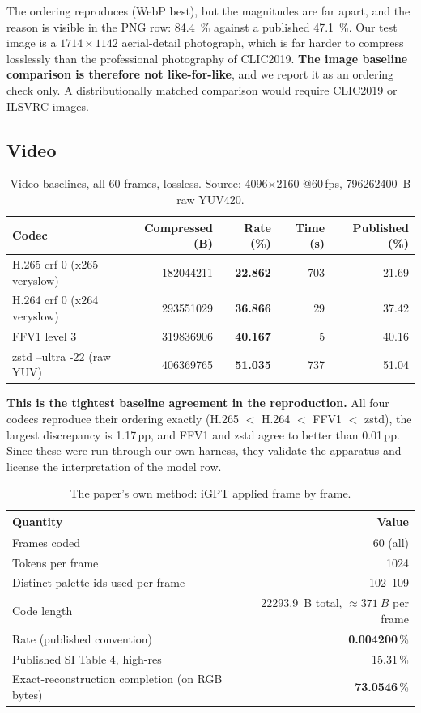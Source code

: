 \documentclass[11pt,a4paper]{article}
\begin{document}
The ordering reproduces (WebP best), but the magnitudes are far apart, and the
reason is visible in the PNG row: \SI{84.4}{\%} against a published
\SI{47.1}{\%}. Our test image is a $1714\times1142$ aerial-detail
photograph, which is far harder to compress losslessly than the professional
photography of CLIC2019. \textbf{The image baseline comparison is therefore not
like-for-like}, and we report it as an ordering check only. A distributionally
matched comparison would require CLIC2019 or ILSVRC images.

\subsection{Video}

\begin{table}[htbp]
\centering
\small
\caption{Video baselines, all \num{60} frames, lossless. Source: 4096$\times$2160
@60\,fps, \SI{796262400}{B} raw YUV420.}
\label{tab:videobase}
\begin{tabular}{lrrrr}
\toprule
Codec & Compressed (B) & Rate (\%) & Time (s) & Published (\%) \\
\midrule
H.265 crf 0 (x265 veryslow) & \num{182044211} & \textbf{22.862} & 703 & 21.69 \\
H.264 crf 0 (x264 veryslow) & \num{293551029} & \textbf{36.866} & 29 & 37.42 \\
FFV1 level 3 & \num{319836906} & \textbf{40.167} & 5 & 40.16 \\
zstd --ultra -22 (raw YUV) & \num{406369765} & \textbf{51.035} & 737 & 51.04 \\
\bottomrule
\end{tabular}
\end{table}

\textbf{This is the tightest baseline agreement in the reproduction.} All four
codecs reproduce their ordering exactly (H.265 $<$ H.264 $<$ FFV1 $<$ zstd), the
largest discrepancy is \num{1.17}\,pp, and FFV1 and zstd agree to better than
\num{0.01}\,pp. Since these were run through our own harness, they validate the
apparatus and license the interpretation of the model row.

\begin{table}[htbp]
\centering
\small
\caption{The paper's own method: iGPT applied frame by frame.}
\label{tab:videoigpt}
\begin{tabular}{lr}
\toprule
Quantity & Value \\
\midrule
Frames coded & \num{60} (all) \\
Tokens per frame & \num{1024} \\
Distinct palette ids used per frame & 102--109 \\
Code length & \SI{22293.9}{B} total, $\approx\SI{371}{B}$ per frame \\
Rate (published convention) & \textbf{0.004200}\,\% \\
Published SI Table 4, high-res & 15.31\,\% \\
Exact-reconstruction completion (on RGB bytes) & \textbf{73.0546}\,\% \\
\bottomrule
\end{tabular}
\end{table}
\end{document}
